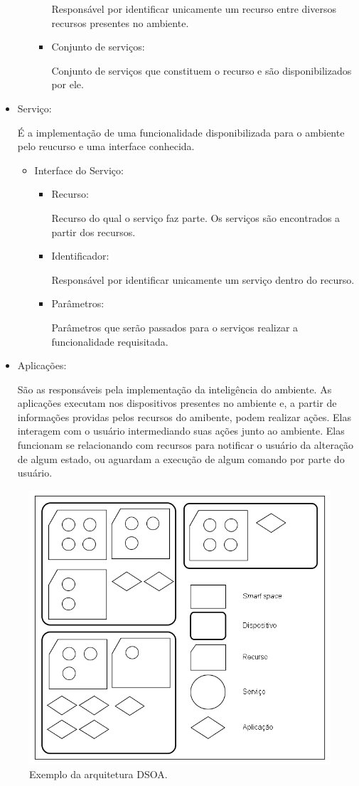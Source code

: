 \begin{itemize}
\begin{itemize}
\begin{itemize}
						Responsável por identificar unicamente um recurso entre diversos recursos presentes no ambiente.
					\item Conjunto de serviços:

						Conjunto de serviços que constituem o recurso e são disponibilizados por ele.
				\end{itemize}
		\end{itemize}
	\item Serviço:

		É a implementação de uma funcionalidade disponibilizada para o ambiente pelo reucurso e uma interface conhecida.
		\begin{itemize}
			\item Interface do Serviço:
			\begin{itemize}
				\item Recurso:

					Recurso do qual o serviço faz parte. Os serviços são encontrados a partir dos recursos.
				\item Identificador:

					Responsável por identificar unicamente um serviço dentro do recurso.
				\item Parâmetros:

					Parâmetros que serão passados para o serviços realizar a funcionalidade requisitada.
			\end{itemize}
		\end{itemize}
	\item Aplicações:
	
		São as responsáveis pela implementação da inteligência do ambiente. As aplicações executam nos dispositivos presentes no ambiente e, a partir de informações providas pelos recursos do amibente, podem realizar ações. Elas interagem com o usuário intermediando suas ações junto ao ambiente. Elas funcionam se relacionando com recursos para notificar o usuário da alteração de algum estado, ou aguardam a execução de algum comando por parte do usuário.
\end{itemize}

\begin{figure}[ht]
	\center
	\includegraphics[scale=0.6]{imagens/arquiteturaDSOA}
	\caption{Exemplo da arquitetura DSOA.}
	\label{fig:arquiteturaDSOA}
\end{figure}